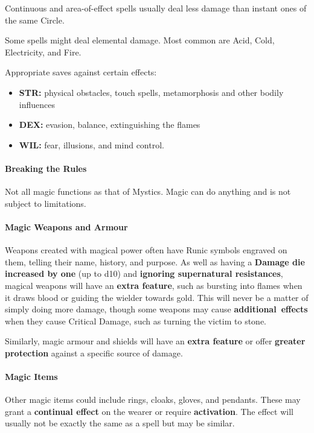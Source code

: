\documentclass[itdr]{subfiles}
\begin{document}
Continuous and area-of-effect spells usually deal less damage than instant ones of the same Circle.

Some spells might deal elemental damage. Most common are Acid, Cold, Electricity, and Fire.

Appropriate saves against certain effects:
\begin{itemize}
	\item \textbf{STR:} physical obstacles, touch spells, metamorphosis and other bodily influences
	\item \textbf{DEX:} evasion, balance, extinguishing the flames
	\item \textbf{WIL:} fear, illusions, and mind control.
\end{itemize}

\vfill
\break

\paragraph{Breaking the Rules}
Not all magic functions as that of Mystics. Magic can do anything and is not subject to limitations.

\vfill

\paragraph{Magic Weapons and Armour}
Weapons created with magical power often have Runic symbols engraved on them, telling their name, history, and purpose. As well as having a \textbf{Damage die increased by one} (up to d10) and \textbf{ignoring supernatural resistances}, magical weapons will have an \textbf{extra feature}, such as bursting into flames when it draws blood or guiding the wielder towards gold. This will never be a matter of simply \mbox{doing} more damage, though some weapons may cause \mbox{\textbf{additional effects}} when they cause Critical Damage, such as turning the victim to stone.

Similarly, magic armour and shields will have an \textbf{extra feature} or offer \textbf{greater protection} against a specific source of damage.

\vfill

\paragraph{Magic Items}
Other magic items could include rings, cloaks, gloves, and pendants. These may grant a \textbf{continual effect} on the wearer or require \textbf{activation}. The effect will usually not be exactly the same as a spell but may be similar.
\end{document}
